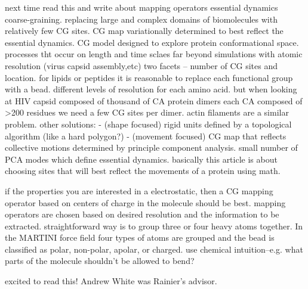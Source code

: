 \documentclass{article}
\begin{document}
\cite{Zhang2008}

next time read this and write about mapping operators
essential dynamics coarse-graining. replacing large and complex domains of biomolecules with relatively few CG sites. CG map variationally determined to best reflect the essential dynamics. CG model designed to explore protein conformational space.
processes tht occur on length and time sclaes far beyond simulations with atomic resolution (virus capsid assembly,etc) 
two facets -- number of CG sites and location. for lipids or peptides it is reasonable to replace each functional group with a bead. different levels of resolution for each amino acid. but when looking at HIV capsid composed of thousand of CA protein dimers each CA composed of >200 residues we need a few CG sites per dimer. actin filaments are a similar problem. 
other solutions: 
- (shape focused) rigid units defined by a topological algorithm (like a hard polygon?)  
- (movement focused) CG map that reflects collective motions determined by principle component analysis. small number of PCA modes which define essential dynamics. basically this article is about choosing sites that will best reflect the movements of a protein using math.


\cite{Cao2015a}
if the properties you are interested in a electrostatic, then a CG mapping operator based on centers of charge in the molecule should be best.
mapping operators are chosen based on desired resolution and the information to be extracted. straightforward way is to group three or four heavy atoms together. In the MARTINI force field four types of atoms are grouped and the bead is classified as polar, non-polar, apolar, or charged. 
use chemical intuition--e.g. what parts of the molecule shouldn't be allowed to bend?

\cite{li2020}
excited to read this! Andrew White was Rainier's advisor.




\end{document}
